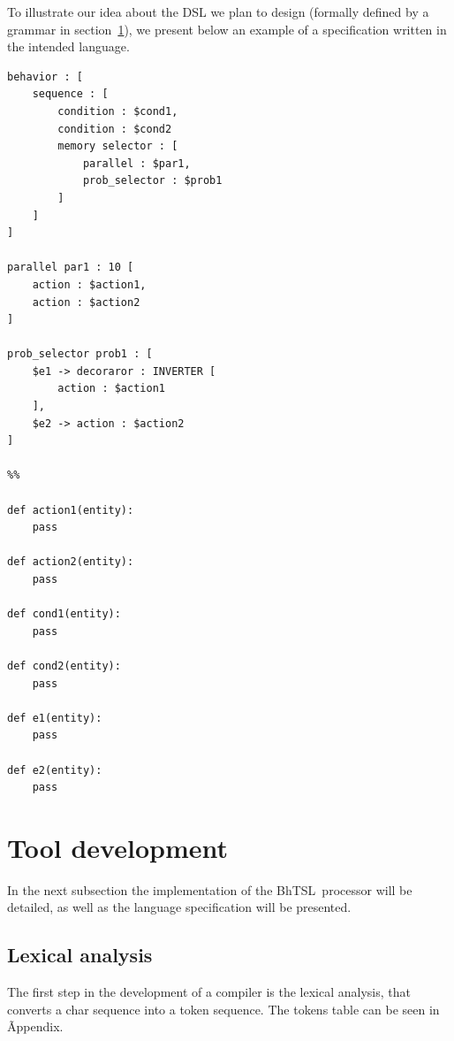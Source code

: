 \documentclass[a4paper,UKenglish,cleveref, autoref, thm-restate]{oasics-v2019}
\def\bht{BhTSL}
\begin{document}
To illustrate our idea about the DSL we plan to design (formally defined by a grammar in section~\ref{sec:tool_development}),
we present below an example of a specification written in the intended language.
\begin{lstlisting}
behavior : [
    sequence : [
        condition : $cond1,
        condition : $cond2
        memory selector : [
            parallel : $par1,
            prob_selector : $prob1
        ]
    ]
]

parallel par1 : 10 [
    action : $action1,
    action : $action2
]

prob_selector prob1 : [
    $e1 -> decoraror : INVERTER [
        action : $action1
    ],
    $e2 -> action : $action2
]

%%

def action1(entity):
    pass

def action2(entity):
    pass

def cond1(entity):
    pass

def cond2(entity):
    pass

def e1(entity):
    pass

def e2(entity):
    pass
\end{lstlisting}

\section{Tool development}
\label{sec:tool_development}
In the next subsection the implementation of the \bht\ processor will be detailed, as well as the language
specification will be presented.

\subsection{Lexical analysis}
The first step in the development of a compiler is the lexical analysis, that converts a char sequence
into a token sequence.
The tokens table can be seen in Ãppendix\label{apx:TokTab}.
\end{document}
